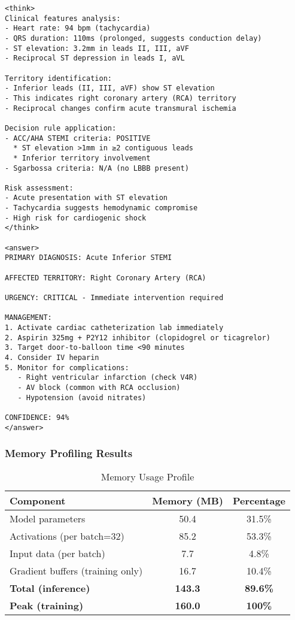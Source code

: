 \documentclass[11pt]{article}
\begin{document}
\begin{lstlisting}[caption=Sample K2-Think Output]
<think>
Clinical features analysis:
- Heart rate: 94 bpm (tachycardia)
- QRS duration: 110ms (prolonged, suggests conduction delay)
- ST elevation: 3.2mm in leads II, III, aVF
- Reciprocal ST depression in leads I, aVL

Territory identification:
- Inferior leads (II, III, aVF) show ST elevation
- This indicates right coronary artery (RCA) territory
- Reciprocal changes confirm acute transmural ischemia

Decision rule application:
- ACC/AHA STEMI criteria: POSITIVE
  * ST elevation >1mm in ≥2 contiguous leads
  * Inferior territory involvement
- Sgarbossa criteria: N/A (no LBBB present)

Risk assessment:
- Acute presentation with ST elevation
- Tachycardia suggests hemodynamic compromise
- High risk for cardiogenic shock
</think>

<answer>
PRIMARY DIAGNOSIS: Acute Inferior STEMI

AFFECTED TERRITORY: Right Coronary Artery (RCA)

URGENCY: CRITICAL - Immediate intervention required

MANAGEMENT:
1. Activate cardiac catheterization lab immediately
2. Aspirin 325mg + P2Y12 inhibitor (clopidogrel or ticagrelor)
3. Target door-to-balloon time <90 minutes
4. Consider IV heparin
5. Monitor for complications:
   - Right ventricular infarction (check V4R)
   - AV block (common with RCA occlusion)
   - Hypotension (avoid nitrates)

CONFIDENCE: 94%
</answer>
\end{lstlisting}

\subsubsection{Memory Profiling Results}

\begin{table}[h]
\centering
\caption{Memory Usage Profile}
\begin{tabular}{@{}lcc@{}}
\toprule
\textbf{Component} & \textbf{Memory (MB)} & \textbf{Percentage} \\
\midrule
Model parameters & 50.4 & 31.5\% \\
Activations (per batch=32) & 85.2 & 53.3\% \\
Input data (per batch) & 7.7 & 4.8\% \\
Gradient buffers (training only) & 16.7 & 10.4\% \\
\midrule
\textbf{Total (inference)} & \textbf{143.3} & \textbf{89.6\%} \\
\textbf{Peak (training)} & \textbf{160.0} & \textbf{100\%} \\
\bottomrule
\end{tabular}
\label{tab:memory_profile}
\end{table}
\end{document}
